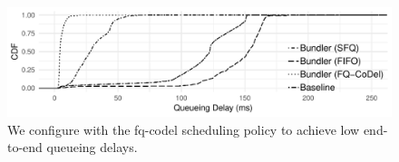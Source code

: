 \begin{figure}
    \centering
\begin{knitrout}
\color{fgcolor}
\includegraphics[width=\maxwidth]{figure/eval:lowdelays-1} 

\end{knitrout}
    \caption{We configure \name with the fq-codel scheduling policy to achieve low end-to-end queueing delays.}
    \label{fig:eval:lowdelays}
\end{figure}
